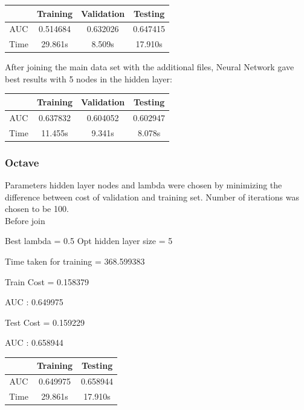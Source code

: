 \documentclass[10pt]{article}
\begin{document}
\begin{center}
 \begin{tabular}{|c | c | c | c||} 
 \hline
 & Training & Validation & Testing\\ [0.5ex] 
 \hline\hline
AUC & 0.514684 & 0.632026 & 0.647415\\
 \hline
Time & 29.861s & 8.509s & 17.910s\\ 
 \hline
\end{tabular}
\end{center}

After joining the main data set with the additional files, Neural Network gave best results with 5 nodes in the hidden layer:\\

\begin{center}
 \begin{tabular}{|c | c | c | c||} 
 \hline
 & Training & Validation & Testing\\ [0.5ex] 
 \hline\hline
AUC & 0.637832 & 0.604052 & 0.602947\\
 \hline
Time & 11.455s & 9.341s & 8.078s\\ 
 \hline
\end{tabular}
\end{center}

\subsubsection{Octave}
Parameters hidden layer nodes and lambda were chosen by minimizing the difference between cost of validation and training set. Number of iterations was chosen to be 100.
\\

Before join

	Best lambda = 0.5 Opt hidden layer size = 5

	Time taken for training = 368.599383

	Train
		Cost = 0.158379

		AUC  : 0.649975	

	Test
		Cost = 0.159229

		AUC  : 0.658944	
\begin{center}
 \begin{tabular}{|c | c | c ||} 
 \hline
 & Training & Testing\\ [0.5ex] 
 \hline\hline
AUC & 0.649975 & 0.658944\\
 \hline
Time & 29.861s & 17.910s\\ 
 \hline
\end{tabular}
\end{center}
\end{document}
